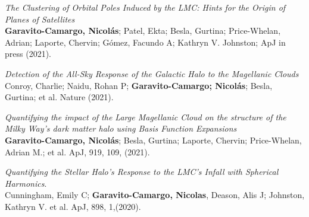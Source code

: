 \documentclass[UTF8]{article}
\begin{document}
\begin{etaremune}
\item \textit{The Clustering of Orbital Poles Induced by the LMC: Hints for
      the Origin of Planes of Satellites}\\ 
      \textbf{Garavito-Camargo, Nicol\'as}; Patel, Ekta; Besla, Gurtina; Price-Whelan,
      Adrian; Laporte, Chervin; G\'omez, Facundo A; Kathryn V. Johnston; ApJ
      in press (2021). 


\item \textit{Detection of the All-Sky Response of the Galactic
  Halo to the Magellanic Clouds}\\ 
  Conroy, Charlie; Naidu, Rohan P; \textbf{Garavito-Camargo; Nicol\'as}; Besla,
  Gurtina; et al. Nature (2021). 

\item \textit{Quantifying the impact of the Large Magellanic Cloud on the
  structure of the Milky Way’s dark matter halo using Basis Function Expansions}\\ 
  \textbf{Garavito-Camargo, Nicol\'as}; Besla, Gurtina; Laporte,
  Chervin; Price-Whelan, Adrian M.; et al. ApJ, 919, 109, (2021). 

\item \textit{Quantifying the Stellar Halo's Response to the LMC's Infall with
  Spherical Harmonics}.\\
  Cunningham, Emily C; \textbf{Garavito-Camargo, Nicolas}, Deason, Alis J;
  Johnston, Kathryn V. et al. ApJ, 898, 1,(2020).


\end{etaremune}
\end{document}
